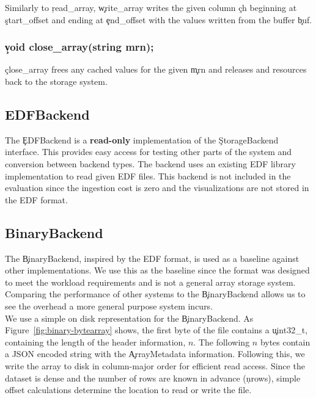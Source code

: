 Similarly to \c{read\_array}, \c{write\_array} writes the given column \c{ch}
beginning at \c{start\_offset} and ending at \c{end\_offset} with the values
written from the buffer \c{buf}.

\subsubsection{\c{void close\_array(string mrn);}}

\c{close\_array} frees any cached values for the given \c{mrn} and releases
and resources back to the storage system.

\subsection{EDFBackend}

The \c{EDFBackend} is a \textbf{read-only} implementation of the \c{StorageBackend}
interface. This provides easy access for testing other parts of the system and
conversion between backend types. The backend uses an existing EDF library
implementation \cite{edflib} to read given EDF files. This backend is not
included in the evaluation since the ingestion cost is zero and the
visualizations are not stored in the EDF format.

\subsection{BinaryBackend}\label{storage-ch:implementation-binary}

The \c{BinaryBackend}, inspired by the EDF format, is used as a baseline
against other implementations. We use this as the baseline since the format was
designed to meet the workload requirements and is not a general array storage
system. Comparing the performance of other systems to the \c{BinaryBackend}
allows us to see the overhead a more general purpose system incurs. \\

We use a simple on disk representation for the \c{BinaryBackend}. As
Figure~\ref{fig:binary-bytearray} shows, the first byte of the file contains a
\c{uint32\_t}, containing the length of the header information, $n$. The
following $n$ bytes contain a JSON encoded string with the \c{ArrayMetadata}
information. Following this, we write the array to disk in column-major order
for efficient read access. Since the dataset is dense and the number of rows
are known in advance (\c{nrows}), simple offset calculations determine the
location to read or write the file. \\

